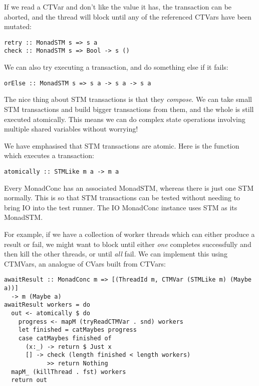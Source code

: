 If we read a CTVar and don't like the value it has, the transaction
can be aborted, and the thread will block until any of the referenced
CTVars have been mutated:

\begin{verbatim}
retry :: MonadSTM s => s a
check :: MonadSTM s => Bool -> s ()
\end{verbatim}

We can also try executing a transaction, and do something else if it
fails:

\begin{verbatim}
orElse :: MonadSTM s => s a -> s a -> s a
\end{verbatim}

The nice thing about STM transactions is that they
\textit{compose}. We can take small STM transactions and build bigger
transactions from them, and the whole is still executed
atomically. This means we can do complex state operations involving
multiple shared variables without worrying!

We have emphasised that STM transactions are atomic. Here is the
function which executes a transaction:

\begin{verbatim}
atomically :: STMLike m a -> m a
\end{verbatim}

\begin{departure}
  Every MonadConc has an associated MonadSTM, whereas there is just
  one STM normally. This is so that STM transactions can be tested
  without needing to bring IO into the test runner. The IO MonadConc
  instance uses STM as its MonadSTM.
\end{departure}

For example, if we have a collection of worker threads which can
either produce a result or fail, we might want to block until either
\textit{one} completes successfully and then kill the other threads,
or until \textit{all} fail. We can implement this using CTMVars, an
analogue of CVars built from CTVars:

\begin{verbatim}
awaitResult :: MonadConc m => [(ThreadId m, CTMVar (STMLike m) (Maybe a))]
  -> m (Maybe a)
awaitResult workers = do
  out <- atomically $ do
    progress <- mapM (tryReadCTMVar . snd) workers
    let finished = catMaybes progress
    case catMaybes finished of
      (x:_) -> return $ Just x
      [] -> check (length finished < length workers)
            >> return Nothing
  mapM_ (killThread . fst) workers
  return out
\end{verbatim}

